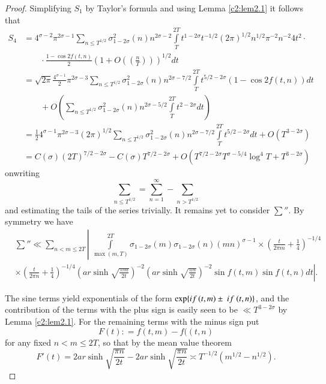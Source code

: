 \begin{proof}
Simplifying $S_1$ by Taylor's formula and using Lemma \ref{c2:lem2.1}
it follows that
{\fontsize{10}{11}\selectfont
\begin{align*}
  S_4 & = 4^{\sigma-2} \pi^{2\sigma-1} \sum_{n \leq T^{1/2}}\sigma^2_{1-
    2\sigma}(n) n^{2 \sigma-2} \int\limits_T^{2T} t^{1- 2 \sigma}
  t^{-1/2} (2 \pi)^{1/2} n^{1/2} \pi^{-2} n^{-2} 4t^2\cdot\\ 
  & \qquad\cdot\frac{1-
    \cos 2f (t, n)}{2} \left(1+ O\left(\left(\frac{n}{T}
  \right)\right)\right)^{1/2} dt\\ 
  & = \sqrt{2 \pi} \frac{4^{\sigma-1}}{2} \pi^{2 \sigma -3} \sum_{n
   \leq T^{1/2}} \sigma^2_{1-2\sigma}(n) n^{2\sigma-7/2}
  \int\limits_T^{2T} t^{5/2-2\sigma} (1- \cos 2f (t, n)) dt\\
  & \qquad+ O\left( \sum_{n \leq T^{1/2}} \sigma_{1-2\sigma}^2 (n)
  n^{2\sigma- 5/2} \int\limits_T^{2T} t^{2- 2 \sigma} dt\right)\\
  & = \frac{1}{2} 4^{\sigma-1} \pi^{2 \sigma-3} (2 \pi)^{1/2} \sum_{n
    \leq T^{1/2}} \sigma^2_{1-2 \sigma} (n) n^{2
    \sigma - 7/2} \int\limits_T^{2T} t^{5/2-2\sigma}dt +
  O(T^{3-2\sigma})\\
  & = C (\sigma) (2T)^{7/2-2\sigma} - C(\sigma)T^{7/2-2\sigma} +
  O(T^{7/2 -2\sigma}T^{\sigma-5/4}\log^4 T+ T^{3-2\sigma})
\end{align*}}
on\pageoriginale writing
$$
\sum_{n \leq T^{1/2}} = \sum^\infty_{n=1} - \sum_{n> T^{1/2}}
$$
and estimating the tails of the series trivially. It remains yet to
consider $\sum''$. By symmetry we have 
{\fontsize{10}{11}
\begin{align*}
&  {\sum}'' \ll \sum_{n < m \leq 2T}  \left|~
  \int\limits_{\max (m, T)}^{2T} \sigma_{1- 2 \sigma}(m) \sigma_{1- 2
    \sigma} (n) (mn) ^{\sigma-1} \times 
  \left(\frac{t}{2 \pi m} + \frac{1}{4} \right)^{-1/4}\right.\\
&  \times\left.\left(\frac{t}{2 \pi n} + \frac{1}{4} \right)^{-1/4}
  \left(ar \sinh 
  \sqrt{\frac{\pi m}{2t}} \right)^{-2} \left(ar \sinh \sqrt{\frac{\pi
      n}{2t}} \right)^{-2} \sin f(t, m) \sin f(t, n)dt \right|.
\end{align*}}

The sine terms yield exponentials of the form $\exp \{if\, (t,
m) \pm ~ if~ (t,\break n)\}$, and the contribution of the terms with
the plus sign is easily seen to be $\ll T^{3-2\sigma}$ by Lemma
\ref{c2:lem2.1}. For the remaining terms with the minus sign put
$$
F(t) : = f(t, m)- f((t, n)
$$
for any fixed $n <m \leq 2T$, so that by the mean value theorem
$$
F' (t) = 2 ar\sinh \sqrt{\frac{\pi n}{2t}} - 2 ar \sinh
\sqrt{\frac{\pi n}{2t}} \asymp T^{-1/2} (m^{1/2} - n^{1/2}).
$$


\end{proof}
